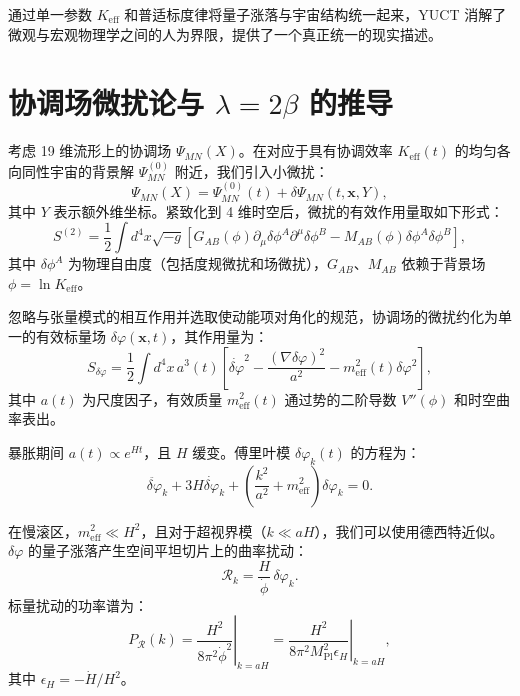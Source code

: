\documentclass[11pt,a4paper]{article}
\newcommand{\Keff}{K_{\mathrm{eff}}}
\newcommand{\Mpl}{M_{\mathrm{Pl}}}
\begin{document}
	通过单一参数 \(K_{\mathrm{eff}}\) 和普适标度律将量子涨落与宇宙结构统一起来，YUCT 消解了微观与宏观物理学之间的人为界限，提供了一个真正统一的现实描述。
	
	\appendix
	\section{协调场微扰论与 \(\lambda = 2\beta\) 的推导}
	\label{app:perturbations}
	
	考虑 19 维流形上的协调场 \(\Psi_{MN}(X)\)。在对应于具有协调效率 \(\Keff(t)\) 的均匀各向同性宇宙的背景解 \(\Psi^{(0)}_{MN}\) 附近，我们引入小微扰：
	\begin{equation}
		\Psi_{MN}(X) = \Psi^{(0)}_{MN}(t) + \delta\Psi_{MN}(t,\mathbf{x},Y),
	\end{equation}
	其中 \(Y\) 表示额外维坐标。紧致化到 4 维时空后，微扰的有效作用量取如下形式：
	\begin{equation}
		S^{(2)} = \frac{1}{2} \int d^4x \sqrt{-g} \left[ G_{AB}(\phi) \partial_\mu \delta\phi^A \partial^\mu \delta\phi^B - M_{AB}(\phi) \delta\phi^A \delta\phi^B \right],
	\end{equation}
	其中 \(\delta\phi^A\) 为物理自由度（包括度规微扰和场微扰），\(G_{AB}\)、\(M_{AB}\) 依赖于背景场 \(\phi = \ln\Keff\)。
	
	忽略与张量模式的相互作用并选取使动能项对角化的规范，协调场的微扰约化为单一的有效标量场 \(\delta\varphi(\mathbf{x},t)\)，其作用量为：
	\begin{equation}
		S_{\delta\varphi} = \frac{1}{2} \int d^4x \, a^3(t) \left[ \dot{\delta\varphi}^2 - \frac{(\nabla\delta\varphi)^2}{a^2} - m_{\mathrm{eff}}^2(t) \delta\varphi^2 \right],
	\end{equation}
	其中 \(a(t)\) 为尺度因子，有效质量 \(m_{\mathrm{eff}}^2(t)\) 通过势的二阶导数 \(V''(\phi)\) 和时空曲率表出。
	
	暴胀期间 \(a(t) \propto e^{Ht}\)，且 \(H\) 缓变。傅里叶模 \(\delta\varphi_k(t)\) 的方程为：
	\begin{equation}
		\ddot{\delta\varphi}_k + 3H\dot{\delta\varphi}_k + \left( \frac{k^2}{a^2} + m_{\mathrm{eff}}^2 \right) \delta\varphi_k = 0.
	\end{equation}
	
	在慢滚区，\(m_{\mathrm{eff}}^2 \ll H^2\)，且对于超视界模（\(k \ll aH\)），我们可以使用德西特近似。\(\delta\varphi\) 的量子涨落产生空间平坦切片上的曲率扰动：
	\begin{equation}
		\mathcal{R}_k = \frac{H}{\dot{\phi}} \, \delta\varphi_k.
	\end{equation}
	标量扰动的功率谱为：
	\begin{equation}
		P_{\mathcal{R}}(k) = \left. \frac{H^2}{8\pi^2 \dot{\phi}^2} \right|_{k=aH} = \left. \frac{H^2}{8\pi^2 \Mpl^2 \epsilon_H} \right|_{k=aH},
	\end{equation}
	其中 \(\epsilon_H = -\dot{H}/H^2\)。
	
\end{document}
